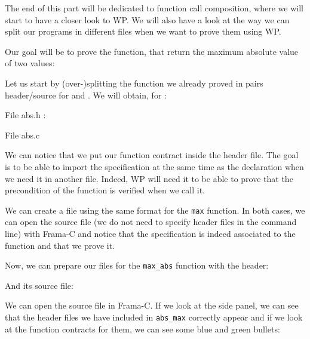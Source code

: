 The end of this part will be dedicated to function call composition,
where we will start to have a closer look to WP. We will also have a
look at the way we can split our programs in different files when we
want to prove them using WP.

Our goal will be to prove the  function, that return
the maximum absolute value of two values:






Let us start by (over-)splitting the function we already proved in pairs
header/source for  and . We will obtain, for
:



File abs.h :




File abs.c




We can notice that we put our function contract inside the header file.
The goal is to be able to import the specification at the same time as
the declaration when we need it in another file. Indeed, WP will need it
to be able to prove that the precondition of the function is verified
when we call it.

We can create a file using the same format for the \texttt{max}
function. In both cases, we can open the source file (we do not need to
specify header files in the command line) with Frama-C and notice that
the specification is indeed associated to the function and that we prove
it.


Now, we can prepare our files for the \texttt{max\_abs} function with
the header:






And its source file:






We can open the source file in Frama-C. If we look at the side panel, we
can see that the header files we have included in \texttt{abs\_max}
correctly appear and if we look at the function contracts for them, we
can see some blue and green bullets:



